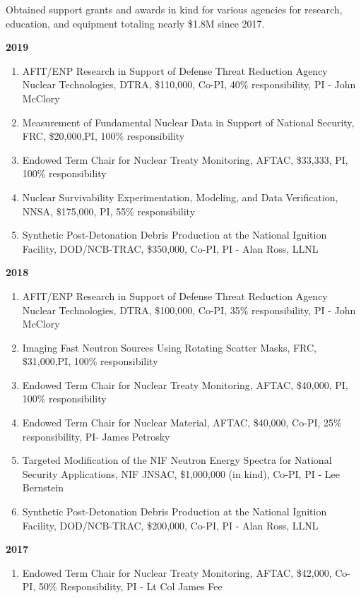 Obtained support grants and awards in kind for various agencies for research, education, and equipment totaling nearly \$1.8M since 2017.

\textbf{2019}
\begin{enumerate}
  \item AFIT/ENP Research in Support of Defense Threat Reduction Agency Nuclear Technologies, DTRA, \$110,000, Co-PI, 40\% responsibility, PI - John McClory
  \item Measurement of Fundamental Nuclear Data in Support of National Security, FRC, \$20,000,PI, 100\% responsibility
  \item Endowed Term Chair for Nuclear Treaty Monitoring, AFTAC, \$33,333, PI, 100\% responsibility 
  \item Nuclear Survivability Experimentation, Modeling, and Data Verification, NNSA, \$175,000, PI, 55\% responsibility
  \item Synthetic Post-Detonation Debris Production at the National Ignition Facility, DOD/NCB-TRAC, \$350,000, Co-PI, PI - Alan Ross, LLNL
\end{enumerate}

\textbf{2018}
\begin{enumerate}
  \item AFIT/ENP Research in Support of Defense Threat Reduction Agency Nuclear Technologies, DTRA, \$100,000, Co-PI, 35\% responsibility, PI - John McClory
  \item Imaging Fast Neutron Sources Using Rotating Scatter Masks, FRC, \$31,000,PI, 100\% responsibility
  \item Endowed Term Chair for Nuclear Treaty Monitoring, AFTAC, \$40,000, PI, 100\% responsibility 
  \item Endowed Term Chair for Nuclear Material, AFTAC, \$40,000, Co-PI, 25\% responsibility, PI- James Petrosky
  \item Targeted Modification of the NIF Neutron Energy Spectra for National Security Applications, NIF JNSAC, \$1,000,000 (in kind), Co-PI, PI - Lee Bernstein
  \item Synthetic Post-Detonation Debris Production at the National Ignition Facility, DOD/NCB-TRAC, \$200,000, Co-PI, PI - Alan Ross, LLNL
\end{enumerate}

\textbf{2017}
\begin{enumerate}
  \item Endowed Term Chair for Nuclear Treaty Monitoring, AFTAC, \$42,000, Co-PI, 50\% Responsibility, PI - Lt Col James Fee  
\end{enumerate}